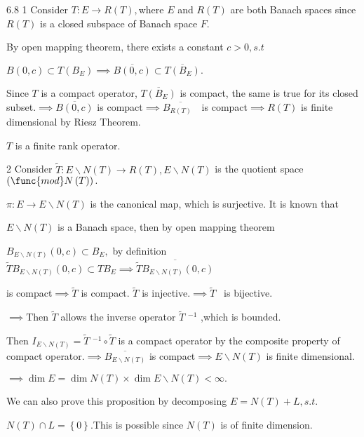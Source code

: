 \documentclass{article}
\begin{document}
6.8 1 Consider $T:E\rightarrow R\left( T\right) ,$where $E$ and $R\left(
T\right) $ are both Banach spaces since $R\left( T\right) $ is a closed
subspace of Banach space $F.$

By open mapping theorem, there exists a constant $c>0,s.t$

$B\left( 0,c\right) \subset T\left( B_{E}\right) \implies \overline{B\left(
0,c\right) }\subset \overline{T\left( B_{E}\right) }.$

Since $T$ is a compact operator, $\overline{T\left( B_{E}\right) }$ is
compact, the same is true for its closed subset.$\implies \overline{B\left(
0,c\right) }$ is compact$\implies \overline{B_{R\left( T\right) }\text{ }}$
is compact$\implies R\left( T\right) $ is finite dimensional by Riesz
Theorem. 

$T$ is a finite rank operator.

2 Consider $\tilde{T}:E\backslash N\left( T\right) \rightarrow R\left(
T\right) ,E\backslash N\left( T\right) $ is the quotient space$\left( \func{%
mod}N\left( T\right) \right) .$

$\pi :E\rightarrow E\backslash N\left( T\right) $ is the canonical map,
which is surjective. It is known that 

$E\backslash N\left( T\right) $ is a Banach space, then by open mapping
theorem

$B_{E\backslash N\left( T\right) }\left( 0,c\right) \subset B_{E},$ by
definition $\tilde{T}B_{E\backslash N\left( T\right) }\left( 0,c\right)
\subset TB_{E}\implies \overline{\tilde{T}B_{E\backslash N\left( T\right)
}\left( 0,c\right) }$

is compact$\implies \tilde{T}$ is compact. $\tilde{T}$ is injective.$%
\implies \tilde{T}$ \ is bijective.

$\implies $Then $\tilde{T}$ allows the inverse operator $\tilde{T}$ $^{-1}$%
,which is bounded.

Then $I_{E\backslash N\left( T\right) }=\tilde{T}$ $^{-1}\circ \tilde{T}$ is
a compact operator by the composite property of compact operator.$\implies 
\overline{B_{E\backslash N\left( T\right) }}$ is compact$\implies
E\backslash N\left( T\right) $ is finite dimensional.

$\implies \dim E=\dim N\left( T\right) \times \dim E\backslash N\left(
T\right) <\infty .$

We can also prove this proposition by decomposing $E=N\left( T\right) +L,s.t.
$

$N\left( T\right) \cap L=\left\{ 0\right\} .$This is possible since $N\left(
T\right) $ is of finite dimension.
\end{document}
